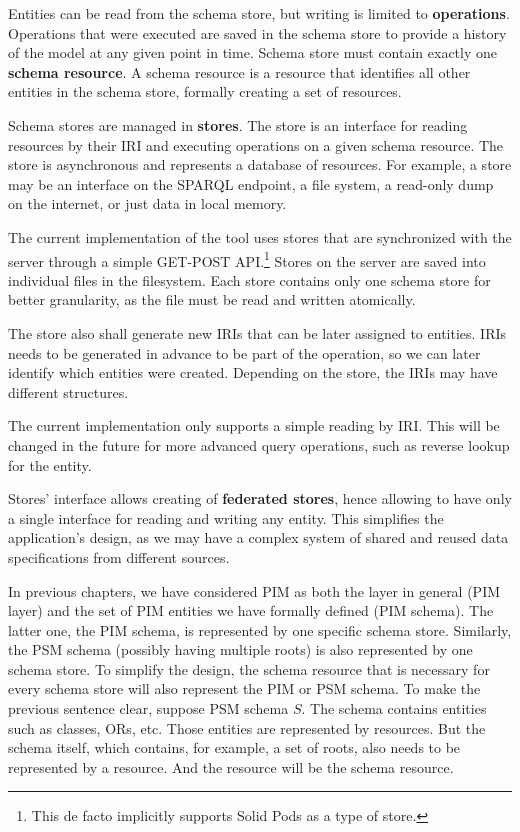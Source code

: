 Entities can be read from the schema store, but writing is limited to \textbf{operations}. Operations that were executed are saved in the schema store to provide a history of the model at any given point in time. Schema store must contain exactly one \textbf{schema resource}. A schema resource is a resource that identifies all other entities in the schema store, formally creating a set of resources.

Schema stores are managed in \textbf{stores}. The store is an interface for reading resources by their IRI and executing operations on a given schema resource. The store is asynchronous and represents a database of resources. For example, a store may be an interface on the SPARQL endpoint, a file system, a read-only dump on the internet, or just data in local memory.

The current implementation of the tool uses stores that are synchronized with the server through a simple GET-POST API.\footnote{This de facto implicitly supports Solid Pods as a type of store.} Stores on the server are saved into individual files in the filesystem. Each store contains only one schema store for better granularity, as the file must be read and written atomically.

\medskip

The store also shall generate new IRIs that can be later assigned to entities. IRIs needs to be generated in advance to be part of the operation, so we can later identify which entities were created. Depending on the store, the IRIs may have different structures.

The current implementation only supports a simple reading by IRI. This will be changed in the future for more advanced query operations, such as reverse lookup for the entity.

\medskip

Stores' interface allows creating of \textbf{federated stores}, hence allowing to have only a single interface for reading and writing any entity. This simplifies the application's design, as we may have a complex system of shared and reused data specifications from different sources.

\medskip

In previous chapters, we have considered PIM as both the layer in general (PIM layer) and the set of PIM entities we have formally defined (PIM schema). The latter one, the PIM schema, is represented by one specific schema store. Similarly, the PSM schema (possibly having multiple roots) is also represented by one schema store. To simplify the design, the schema resource that is necessary for every schema store will also represent the PIM or PSM schema. To make the previous sentence clear, suppose PSM schema $S$. The schema contains entities such as classes, ORs, etc. Those entities are represented by resources. But the schema itself, which contains, for example, a set of roots, also needs to be represented by a resource. And the resource will be the schema resource.

